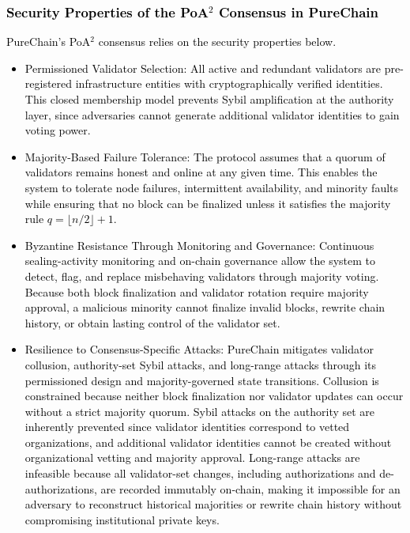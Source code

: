 \cite{cho2010survey}\documentclass[journal,comsoc,twoside]{IEEEtran}
\begin{document}
\textcolor{black}{
\subsubsection{Security Properties of the PoA$^2$ Consensus in PureChain}
PureChain’s PoA$^2$ consensus relies on the security properties below.
\begin{itemize}
    \item Permissioned Validator Selection: All active and redundant validators are pre-registered infrastructure entities with cryptographically verified identities. This closed membership model prevents Sybil amplification at the authority layer, since adversaries cannot generate additional validator identities to gain voting power.
    \item Majority-Based Failure Tolerance: The protocol assumes that a quorum of validators remains honest and online at any given time. This enables the system to tolerate node failures, intermittent availability, and minority faults while ensuring that no block can be finalized unless it satisfies the majority rule $q=\lfloor n/2 \rfloor + 1$.
    \item Byzantine Resistance Through Monitoring and Governance: Continuous sealing-activity monitoring and on-chain governance allow the system to detect, flag, and replace misbehaving validators through majority voting. Because both block finalization and validator rotation require majority approval, a malicious minority cannot finalize invalid blocks, rewrite chain history, or obtain lasting control of the validator set.
    \item Resilience to Consensus-Specific Attacks: PureChain mitigates validator collusion, authority-set Sybil attacks, and long-range attacks through its permissioned design and majority-governed state transitions. Collusion is constrained because neither block finalization nor validator updates can occur without a strict majority quorum. Sybil attacks on the authority set are inherently prevented since validator identities correspond to vetted organizations, and additional validator identities cannot be created without organizational vetting and majority approval. Long-range attacks are infeasible because all validator-set changes, including authorizations and de-authorizations, are recorded immutably on-chain, making it impossible for an adversary to reconstruct historical majorities or rewrite chain history without compromising institutional private keys.
\end{itemize}
}
\end{document}
